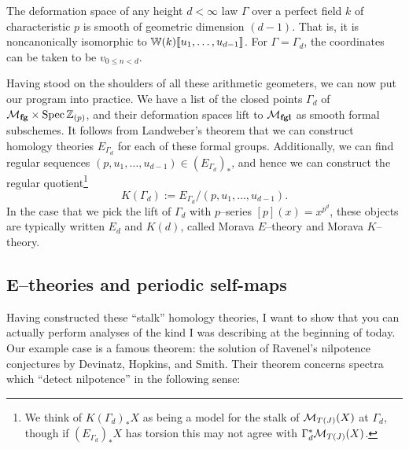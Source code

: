 \begin{theorem}
The deformation space of any height $d < \infty$ law $\Gamma$ over a perfect field $k$ of characteristic $p$ is smooth of geometric dimension $(d-1)$.  That is, it is noncanonically isomorphic to $\mathbb W(k)\llbracket{u_1, \ldots, u_{d-1}}\rrbracket$.  For $\Gamma = \Gamma_d$, the coordinates can be taken to be $v_{0 \le n < d}$.
\end{theorem}



Having stood on the shoulders of all these arithmetic geometers, we can now put our program into practice.  We have a list of the closed points $\Gamma_d$ of $\mathcal{M}_{\mathbf{fg}} \times \operatorname{Spec} \mathbb Z_{(p)}$, and their deformation spaces lift to $\mathcal{M}_{\mathbf{fgl}}$ as smooth formal subschemes.  It follows from Landweber's theorem that we can construct homology theories $E_{\Gamma_d}$ for each of these formal groups.  Additionally, we can find regular sequences $(p, u_1, \ldots, u_{d-1}) \in (E_{\Gamma_d})_*$, and hence we can construct the regular quotient\footnote{We think of $K(\Gamma_d)_* X$ as being a model for the stalk of $\mathcal{M}_{T(J)}(X)$ at $\Gamma_d$, though if $(E_{\Gamma_d})_* X$ has torsion this may not agree with $\Gamma_d^* \mathcal{M}_{T(J)}(X)$.} \[K(\Gamma_d) := E_{\Gamma_d} / (p, u_1, \ldots, u_{d-1}).\]  In the case that we pick the lift of $\Gamma_d$ with $p$--series $[p](x) = x^{p^d}$, these objects are typically written $E_d$ and $K(d)$, called Morava $E$--theory and Morava $K$--theory.




\subsection{E--theories and periodic self-maps}

Having constructed these ``stalk'' homology theories, I want to show that you can actually perform analyses of the kind I was describing at the beginning of today.  Our example case is a famous theorem: the solution of Ravenel's nilpotence conjectures by Devinatz, Hopkins, and Smith.  Their theorem concerns spectra which ``detect nilpotence'' in the following sense:

